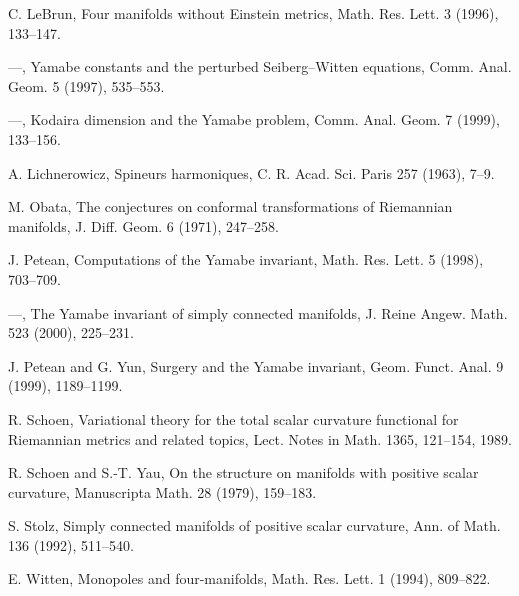 \documentclass[uplatex,dvipdfmx]{jlreq}
\begin{document}
\begin{enumerate}[{[1]}]
  \item C. LeBrun, Four manifolds without Einstein metrics, Math. Res. Lett. 3
    (1996), 133--147.
  \item ---, Yamabe constants and the perturbed Seiberg--Witten equations,
    Comm. Anal. Geom. 5 (1997), 535--553.
  \item ---, Kodaira dimension and the Yamabe problem, Comm.
    Anal. Geom. 7 (1999), 133--156.
  \item A. Lichnerowicz, Spineurs harmoniques, C. R. Acad. Sci. Paris 257
    (1963), 7--9.
  \item M. Obata, The conjectures on conformal transformations of Riemannian
    manifolds, J. Diff. Geom. 6 (1971), 247--258.
  \item J. Petean, Computations of the Yamabe invariant, Math. Res. Lett. 5
    (1998), 703--709.
  \item ---, The Yamabe invariant of simply connected manifolds, J. Reine
    Angew. Math. 523 (2000), 225--231.
  \item J. Petean and G. Yun, Surgery and the Yamabe invariant, Geom. Funct.
    Anal. 9 (1999), 1189--1199.
  \item R. Schoen, Variational theory for the total scalar curvature functional
    for Riemannian metrics and related topics, Lect. Notes in Math. 1365,
    121--154, 1989.
  \item R. Schoen and S.-T. Yau, On the structure on manifolds with positive
    scalar curvature, Manuscripta Math. 28 (1979), 159--183.
  \item S. Stolz, Simply connected manifolds of positive scalar curvature,
    Ann. of Math. 136 (1992), 511--540.
  \item E. Witten, Monopoles and four-manifolds, Math. Res. Lett. 1 (1994),
    809--822.
\end{enumerate}
\end{document}
